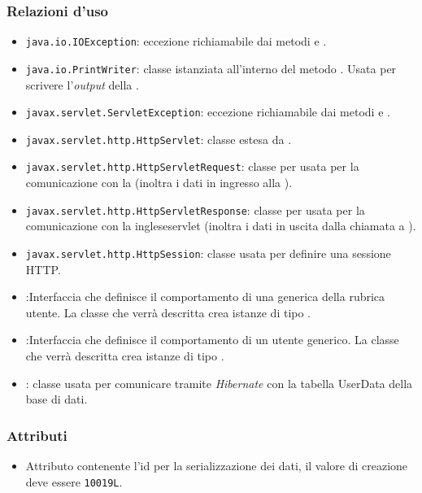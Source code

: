\subsubsection*{Relazioni d'uso}

\begin{itemize}
	\item \texttt{java.io.IOException}: eccezione richiamabile dai metodi  e .
	\item \texttt{java.io.PrintWriter}: classe istanziata all'interno del metodo . Usata per scrivere l'\textit{output} della .
	\item \texttt{javax.servlet.ServletException}: eccezione richiamabile dai metodi  e .
	\item \texttt{javax.servlet.http.HttpServlet}: classe estesa da .
	\item \texttt{javax.servlet.http.HttpServletRequest}:  classe per usata per la comunicazione con la  (inoltra i dati in ingresso alla ).
	\item \texttt{javax.servlet.http.HttpServletResponse}: classe per usata per la comunicazione con la inglese{servlet} (inoltra i dati in uscita dalla chiamata a ).
	\item \texttt{javax.servlet.http.HttpSession}: classe usata per definire una sessione HTTP.
	\item {}:Interfaccia che definisce il comportamento di una generica  della rubrica utente. La classe che verrà descritta crea istanze di tipo .
	\item {}:Interfaccia che definisce il comportamento di un utente generico. La classe che verrà descritta crea istanze di tipo .
	\item {}: classe usata per comunicare tramite \textit{Hibernate} con la tabella UserData della base di dati.
\end{itemize}

\subsubsection*{Attributi}

\begin{itemize}
	\item{}
	Attributo contenente l'id per la serializzazione dei dati, il valore di creazione deve essere \texttt{10019L}.
\end{itemize}

